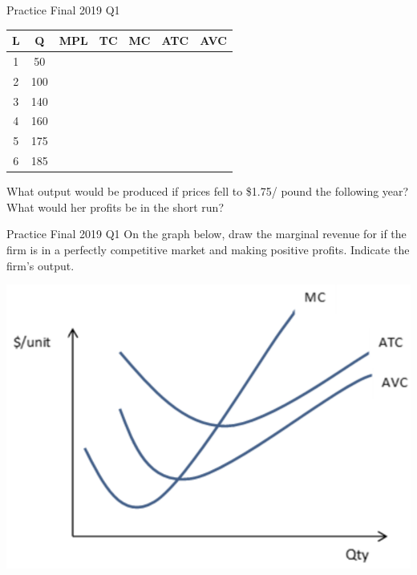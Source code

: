 \documentclass{beamer}
\begin{document}
\begin{frame}{Practice Final 2019 Q1}
    \begin{table}[]
    \begin{tabular}{ccccccc}
    L & Q   & MPL & TC & MC & ATC & AVC \\ \hline
    1 & 50  &     &    &    &     &     \\ \hline
    2 & 100 &     &    &    &     &     \\ \hline
    3 & 140 &     &    &    &     &     \\ \hline
    4 & 160 &     &    &    &     &     \\ \hline
    5 & 175 &     &    &    &     &     \\ \hline
    6 & 185 &     &    &    &     &    
    \end{tabular}
    \end{table}
    What output would be produced if prices fell to \$1.75/ pound the following year? What would her profits be in the short run?
\end{frame}

\begin{frame}{Practice Final 2019 Q1}
    On the graph below, draw the marginal revenue for if the firm is in a perfectly competitive market and making positive profits. Indicate the firm’s output.
    \begin{center}
        \includegraphics[scale = .6]{images/less_nice_graph.png}
    \end{center}
\end{frame}
\end{document}
